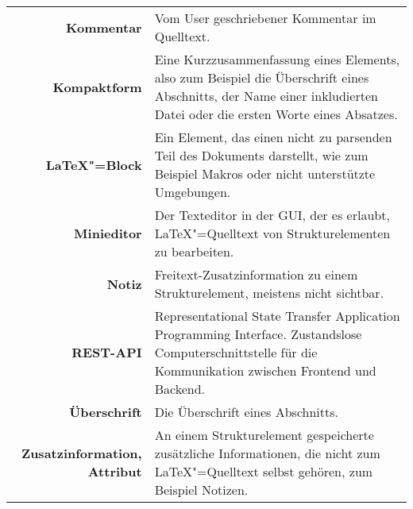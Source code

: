 \begin{longtable}{>{\bfseries}rp{9cm}}
  Kommentar &
  Vom User geschriebener Kommentar im Quelltext. \\

  Kompaktform &
  Eine Kurzzusammenfassung eines Elements, also zum Beispiel die Überschrift eines Abschnitts, der Name einer
  inkludierten Datei oder die ersten Worte eines Absatzes. \\

  \LaTeX"=Block &
  Ein Element, das einen nicht zu parsenden Teil des Dokuments darstellt, wie zum Beispiel Makros oder nicht
  unterstützte Umgebungen. \\

  Minieditor &
  Der Texteditor in der GUI, der es erlaubt, \LaTeX"=Quelltext von Strukturelementen zu bearbeiten. \\

  Notiz &
  Freitext-Zusatzinformation zu einem Strukturelement, meistens nicht sichtbar. \\

  REST-API &
  Representational State Transfer Application Programming Interface.
  Zustandslose Computerschnittstelle für die Kommunikation zwischen Frontend und Backend. \\

  Überschrift &
  Die Überschrift eines Abschnitts. \\

  Zusatzinformation, Attribut &
  An einem Strukturelement gespeicherte zusätzliche Informationen, die nicht zum \LaTeX"=Quelltext selbst gehören,
  zum Beispiel Notizen. \\
\end{longtable}
